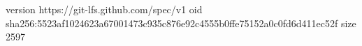 version https://git-lfs.github.com/spec/v1
oid sha256:5523af1024623a67001473c935c876e92c4555b0ffe75152a0c0fd6d411ec52f
size 2597
